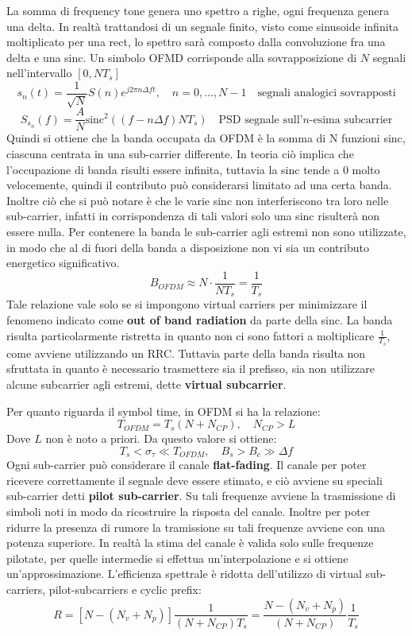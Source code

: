 La somma di frequency tone genera uno spettro a righe, ogni frequenza genera una delta. In realtà trattandosi di un segnale finito, visto come sinusoide infinita moltiplicato per una rect, lo spettro sarà composto dalla convoluzione fra una delta e una sinc.
Un simbolo OFMD corrisponde alla sovrapposizione di $N$ segnali nell'intervallo $[0, NT_s]$
\[
    s_n(t) = \frac{1}{\sqrt{N}} S(n) e^{j2\pi n \Delta f t}, \quad n = 0, \ldots, N-1 \quad \text{segnali analogici sovrapposti}
\]
\[
    S_{s_n}(f) = \frac{A}{N} \text{sinc}^2 ((f-n\Delta f)N T_s) \quad \text{PSD segnale sull'$n$-esima subcarrier}
\]
Quindi si ottiene che la banda occupata da OFDM è la somma di N funzioni sinc, ciascuna centrata in una sub-carrier differente. In teoria ciò implica che l'occupazione di banda risulti essere infinita, tuttavia la sinc tende a 0 molto velocemente, quindi il contributo può considerarsi limitato ad una certa banda. Inoltre ciò che si può notare è che le varie sinc non interferiscono tra loro nelle sub-carrier, infatti in corrispondenza di tali valori solo una sinc risulterà non essere nulla. Per contenere la banda le sub-carrier agli estremi non sono utilizzate, in modo che al di fuori della banda a disposizione non vi sia un contributo energetico significativo.
\[
    B_{OFDM} \approx N \cdot \frac{1}{NT_s} = \frac{1}{T_s}
\]
Tale relazione vale solo se si impongono virtual carriers per minimizzare il fenomeno indicato come \textbf{out of band radiation} da parte della sinc.
La banda risulta particolarmente ristretta in quanto non ci sono fattori a moltiplicare $\frac{1}{T_s}$, come avviene utilizzando un RRC. Tuttavia parte della banda risulta non sfruttata in quanto è necessario trasmettere sia il prefisso, sia non utilizzare alcune subcarrier agli estremi, dette \textbf{virtual subcarrier}.


Per quanto riguarda il symbol time, in OFDM si ha la relazione:
\[
    T_{OFDM} = T_s(N+N_{CP}), \quad N_{CP} > L
\]  
Dove $L$ non è noto a priori.
Da questo valore si ottiene:
\[
    T_s < \sigma_{\tau} \ll T_{OFDM}, \quad B_s > B_c \gg \Delta f
\]
Ogni sub-carrier può considerare il canale \textbf{flat-fading}. Il canale per poter ricevere correttamente il segnale deve essere stimato, e ciò avviene su speciali sub-carrier detti \textbf{pilot sub-carrier}. Su tali frequenze avviene la trasmissione di simboli noti in modo da ricostruire la risposta del canale. Inoltre per poter ridurre la presenza di rumore la tramissione su tali frequenze avviene con una potenza superiore. In realtà la stima del canale è valida solo sulle frequenze pilotate, per quelle intermedie si effettua un'interpolazione e si ottiene un'approssimazione.
L'efficienza spettrale è ridotta dell'utilizzo di virtual sub-carriers, pilot-subcarriers e cyclic prefix:
\[
    R = \left[N - (N_v + N_p) \right]\frac{1}{(N+N_{CP})T_s} = \frac{N - (N_v + N_p)}{(N+N_{CP})} \frac{1}{T_s}
\]



